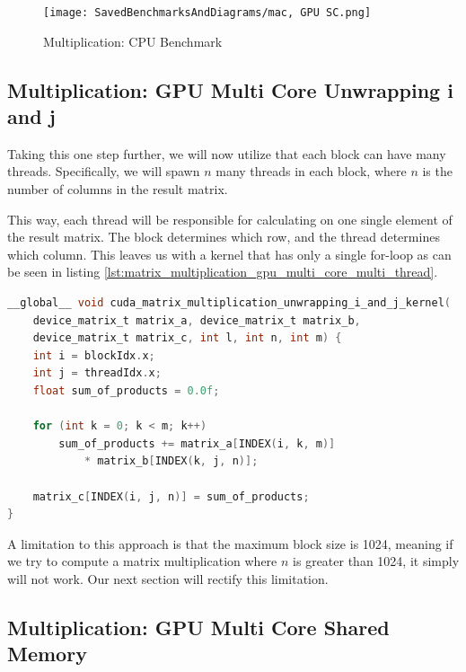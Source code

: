 \begin{figure}[h]
  \texttt{[image: SavedBenchmarksAndDiagrams/mac, GPU SC.png]}
  \centering
  \caption{Multiplication: CPU Benchmark}
  \label{fig:mul_cpu_bench}
\end{figure}

\subsection{Multiplication: GPU Multi Core Unwrapping i and j}

Taking this one step further, we will now utilize that each block can have many threads. Specifically, we will spawn $n$ many threads in each block, where $n$ is the number of columns in the result matrix. 

This way, each thread will be responsible for calculating on one single element of the result matrix. The block determines which row, and the thread determines which column. This leaves us with a kernel that has only a single for-loop as can be seen in listing \ref{lst:matrix_multiplication_gpu_multi_core_multi_thread}. 

\begin{lstlisting}[language=C, caption={Multi Core Multi Thread Matrix Multiplication}, label={lst:matrix_multiplication_gpu_multi_core_multi_thread}]
__global__ void cuda_matrix_multiplication_unwrapping_i_and_j_kernel(
    device_matrix_t matrix_a, device_matrix_t matrix_b,
    device_matrix_t matrix_c, int l, int n, int m) {
    int i = blockIdx.x;
    int j = threadIdx.x;
    float sum_of_products = 0.0f;

    for (int k = 0; k < m; k++)
        sum_of_products += matrix_a[INDEX(i, k, m)] 
            * matrix_b[INDEX(k, j, n)];

    matrix_c[INDEX(i, j, n)] = sum_of_products;
}
\end{lstlisting}

A limitation to this approach is that the maximum block size is 1024, meaning if we try to compute a matrix multiplication where $n$ is greater than 1024, it simply will not work. Our next section will rectify this limitation.

\subsection{Multiplication: GPU Multi Core Shared Memory}


